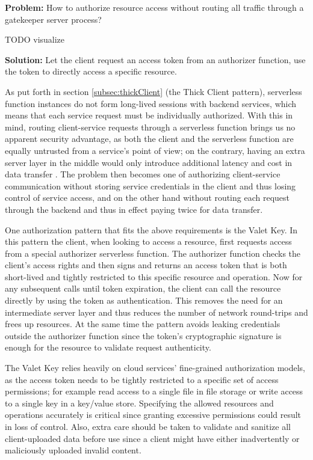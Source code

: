 \textbf{Problem:} How to authorize resource access without routing all traffic through a gatekeeper server process?

TODO visualize

\textbf{Solution:} Let the client request an access token from an authorizer function, use the token to directly access a specific resource.

As put forth in section \ref{subsec:thickClient} (the Thick Client pattern), serverless function instances do not form long-lived sessions with backend services, which means that each service request must be individually authorized. With this in mind, routing client-service requests through a serverless function brings us no apparent security advantage, as both the client and the serverless function are equally untrusted from a service's point of view; on the contrary, having an extra server layer in the middle would only introduce additional latency and cost in data transfer \parencite{adzic2017serverless}. The problem then becomes one of authorizing client-service communication without storing service credentials in the client and thus losing control of service access, and on the other hand without routing each request through the backend and thus in effect paying twice for data transfer.

One authorization pattern that fits the above requirements is the Valet Key. In this pattern the client, when looking to access a resource, first requests access from a special authorizer serverless function. The authorizer function checks the client's access rights and then signs and returns an access token that is both short-lived and tightly restricted to this specific resource and operation. Now for any subsequent calls until token expiration, the client can call the resource directly by using the token as authentication. This removes the need for an intermediate server layer and thus reduces the number of network round-trips and frees up resources. At the same time the pattern avoids leaking credentials outside the authorizer function since the token's cryptographic signature is enough for the resource to validate request authenticity. \parencite{microsoft18cloudPatterns}

The Valet Key relies heavily on cloud services' fine-grained authorization models, as the access token needs to be tightly restricted to a specific set of access permissions; for example read access to a single file in file storage or write access to a single key in a key/value store. Specifying the allowed resources and operations accurately is critical since granting excessive permissions could result in loss of control. Also, extra care should be taken to validate and sanitize all client-uploaded data before use since a client might have either inadvertently or maliciously uploaded invalid content. \parencite{microsoft18cloudPatterns}

